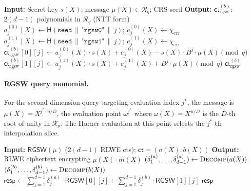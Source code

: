 \documentclass[11pt,a4paper]{article}
\DeclareMathOperator{\ExternalProd}{ExtProd}
\newcommand{\R}{\mathcal{R}}
\newcommand{\Rq}{\R_{q}}
\newcommand{\Rp}{\R_{p}}
\begin{document}
\begin{algorithm}[H]
\caption{$\textsc{RGSW.Enc}_b(s(X),\; \mu(X),\; \texttt{seed})$: Generate RGSW $b$-parts.}
\label{alg:rgsw-enc}
\begin{algorithmic}[1]
\State \textbf{Input:} Secret key $s(X)$; message $\mu(X) \in \Rq$; CRS seed
\State \textbf{Output:} $\mathsf{ct}_{\mathrm{rgsw}}^{(b)}$: $2(d\!-\!1)$ polynomials in $\Rq$ (NTT form)
 
    \State $a_j^{(0)}(X) \gets \mathsf{H}(\texttt{seed} \,\|\, \texttt{"rgsw0"} \,\|\, j)$; \quad $e_j^{(0)}(X) \gets \chi_{\mathrm{err}}$ 
    \State $a_j^{(1)}(X) \gets \mathsf{H}(\texttt{seed} \,\|\, \texttt{"rgsw1"} \,\|\, j)$; \quad $e_j^{(1)}(X) \gets \chi_{\mathrm{err}}$
    \State $\mathsf{ct}_{\mathrm{rgsw}}^{(b)}[0][j] \gets a_j^{(0)}(X) \cdot s(X) + e_j^{(0)}(X) - s(X) \cdot B^j \cdot \mu(X) \pmod{q}$ 
    \State $\mathsf{ct}_{\mathrm{rgsw}}^{(b)}[1][j] \gets a_j^{(1)}(X) \cdot s(X) + e_j^{(1)}(X) + B^j \cdot \mu(X) \pmod{q}$ 
\EndFor
\State \Return $\mathsf{ct}_{\mathrm{rgsw}}^{(b)}$
\end{algorithmic}
\end{algorithm}

\paragraph{RGSW query monomial.}
For the second-dimension query targeting evaluation index $j^*$, the message is $\mu(X) = X^{j^* \cdot n/D}$, the evaluation point $\omega^{j^*}$ where $\omega(X) = X^{n/D}$ is the $D$-th root of unity in $\Rp$.
The Horner evaluation at this point selects the $j^*$-th interpolation slice.

\begin{algorithm}[H]
\caption{$\ExternalProd(\mathsf{RGSW}(\mu),\; \mathsf{ct})$: RGSW $\times$ RLWE (approximate).}
\label{alg:extprod}
\begin{algorithmic}[1]
\State \textbf{Input:} $\mathsf{RGSW}(\mu)$ ($2(d\!-\!1)$ RLWE cts); $\mathsf{ct} = (a(X), b(X))$
\State \textbf{Output:} RLWE ciphertext encrypting $\mu(X) \cdot m(X)$
\State $(\delta_1^{(a)}, \ldots, \delta_{d-1}^{(a)}) \gets \textsc{Decomp}(a(X))$ 
\State $(\delta_1^{(b)}, \ldots, \delta_{d-1}^{(b)}) \gets \textsc{Decomp}(b(X))$ 
\State $\mathsf{resp} \gets \sum_{j=1}^{d-1} \delta_j^{(a)} \cdot \mathsf{RGSW}[0][j] + \sum_{j=1}^{d-1} \delta_j^{(b)} \cdot \mathsf{RGSW}[1][j]$ 
\State \Return $\mathsf{resp}$
\end{algorithmic}
\end{algorithm}
\end{document}
